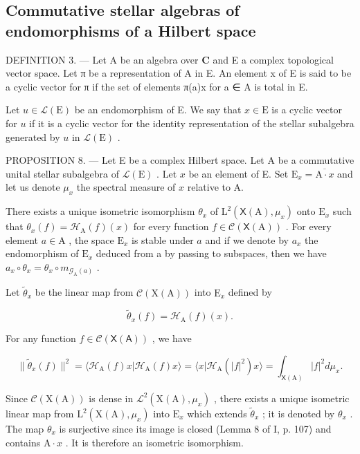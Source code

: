 \subsection{Commutative stellar algebras of endomorphisms of a Hilbert space}

DEFINITION 3. --- Let A be an algebra over \(\mathbf{C}\) and E a complex topological vector space. Let π be a representation of A in E. An element x of E is said to be a cyclic vector for π if the set of elements π(a)x for a ∈ A is total in E.

Let \(u \in \mathcal{L}(\mathrm{E})\) be an endomorphism of E. We say that \(x \in \mathrm{E}\) is a cyclic vector for \(u\) if it is a cyclic vector for the identity representation of the stellar subalgebra generated by \(u\) in \(\mathcal{L}(\mathrm{E})\) .

PROPOSITION 8. --- Let E be a complex Hilbert space. Let A be a commutative unital stellar subalgebra of \(\mathcal{L}(\mathrm{E})\) . Let \(x\) be an element of E. Set \(\mathrm{E}_x = \overline{\mathrm{A} \cdot x}\) and let us denote \(\mu_x\) the spectral measure of \(x\) relative to A.

There exists a unique isometric isomorphism \(\theta_x\) of \(\mathrm{L}^2 (\mathsf{X}(\mathrm{A}),\mu_x)\) onto \(\mathrm{E}_x\) such that \(\theta_{x}(f) = \mathcal{H}_{\mathrm{A}}(f)(x)\) for every function \(f\in \mathcal{C}(\mathsf{X}(\mathrm{A}))\) . For every element \(a\in \mathrm{A}\) , the space \(\mathrm{E}_x\) is stable under \(a\) and if we denote by \(a_{x}\) the endomorphism of \(\mathrm{E}_x\) deduced from a by passing to subspaces, then we have \(a_{x}\circ \theta_{x} = \theta_{x}\circ m_{\mathcal{G}_{\mathrm{A}}(a)}\) .

Let \(\widetilde{\theta}_x\) be the linear map from \(\mathcal{C}(\mathrm{X(A)})\) into \(\mathrm{E}_x\) defined by

\[
\widetilde {\theta} _ {x} (f) = \mathcal {H} _ {\mathrm{A}} (f) (x).
\]

For any function \(f \in \mathcal{C}(\mathsf{X}(\mathsf{A}))\) , we have

\[
\| \widetilde {\theta} _ {x} (f) \| ^ {2} = \langle \mathcal {H} _ {\mathrm{A}} (f) x | \mathcal {H} _ {\mathrm{A}} (f) x \rangle = \langle x | \mathcal {H} _ {\mathrm{A}} (| f | ^ {2}) x \rangle = \int_ {\mathsf {X} (\mathrm{A})} | f | ^ {2} d \mu_ {x}.
\]

Since \(\mathcal{C}(\mathrm{X(A)})\) is dense in \(\mathcal{L}^2 (\mathrm{X(A)},\mu_x)\) , there exists a unique isometric linear map from \(\mathrm{L}^2 (\mathrm{X(A)},\mu_x)\) into \(\mathrm{E}_x\) which extends \(\widetilde{\theta}_x\) ; it is denoted by \(\theta_{x}\) . The map \(\theta_{x}\) is surjective since its image is closed (Lemma 8 of I, p. 107) and contains \(\mathrm{A}\cdot x\) . It is therefore an isometric isomorphism.

